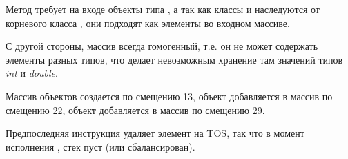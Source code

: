 Метод  требует на входе объекты типа , а так как классы  и
 наследуются от корневого класса , они подходят как элементы
во входном массиве.

С другой стороны, массив всегда гомогенный, т.е. он не может содержать элементы разных типов,
что делает невозможным хранение там значений типов \emph{int} и \emph{double}.


Массив объектов  создается по смещению 13, 
объект  добавляется в массив по смещению 22, 
объект  добавляется в массив по смещению 29.


Предпоследняя инструкция  удаляет элемент на \ac{TOS}, 
так что в момент исполнения , стек пуст (или сбалансирован).
